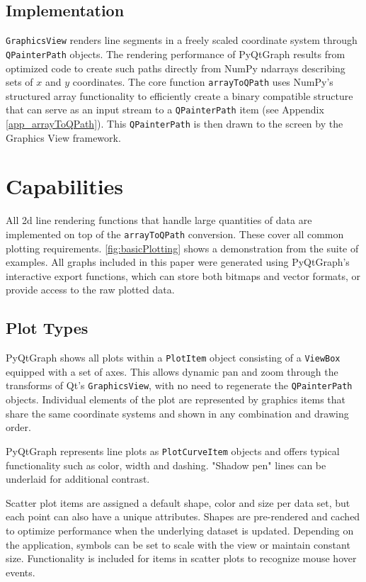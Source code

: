 \subsection{Implementation}
\texttt{GraphicsView} renders line segments in a freely scaled coordinate system through \texttt{QPainterPath} objects. The rendering performance of PyQtGraph results from optimized code to create such paths directly from NumPy ndarrays describing sets of $x$ and $y$ coordinates. The core function \texttt{arrayToQPath} uses NumPy's structured array functionality to efficiently create a binary compatible structure that can serve as an input stream to a \texttt{QPainterPath} item (see Appendix \autoref{app_arrayToQPath}). This \texttt{QPainterPath} is then drawn to the screen by the Graphics View framework.

\section{Capabilities}

All 2d line rendering functions that handle large quantities of data are implemented on top of the \texttt{arrayToQPath} conversion. These cover all common plotting requirements. \autoref{fig:basicPlotting} shows a demonstration from the suite of examples. All graphs included in this paper were generated using PyQtGraph's interactive export functions, which can store both bitmaps and vector formats, or provide access to the raw plotted data.

\subsection{Plot Types}

PyQtGraph shows all plots within a \texttt{PlotItem} object consisting of a \texttt{ViewBox} equipped with a set of axes. This allows dynamic pan and zoom through the transforms of Qt's \texttt{GraphicsView}, with no need to regenerate the \texttt{QPainterPath} objects. Individual elements of the plot are represented by graphics items that share the same coordinate systems and shown in any combination and drawing order. 

PyQtGraph represents line plots as \texttt{PlotCurveItem} objects and offers typical functionality such as color, width and dashing. "Shadow pen" lines can be underlaid for additional contrast. 

Scatter plot items are assigned a default shape, color and size per data set, but each point can also have a unique attributes. Shapes are pre-rendered and cached to optimize performance when the underlying dataset is updated. Depending on the application, symbols can be set to scale with the view or maintain constant size.  Functionality is included for items in scatter plots to recognize mouse hover events.

